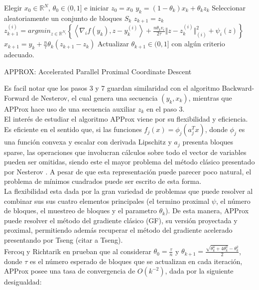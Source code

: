 \documentclass{article}
\newcommand{\R}{\mathbb{R}}
\begin{document}
\begin{algorithm}[H]
\begin{algorithmic}[1]
\STATE Elegir $x_0 \in \R^N$, $\theta_0 \in (0,1]$ e iniciar $z_0 = x_0$
	\STATE $y_k = (1-\theta_k)x_k+\theta_k z_k$
	\STATE Seleccionar aleatoriamente un conjunto de bloques $S_k$
	\STATE $z_{k+1} = z_k$
		\STATE $z^{(i)}_{k+1} = argmin_{z \in \R^{N_i}} \left\lbrace \left< \nabla_i f(y_k),z-y^{(i)}_k   \right> + \frac{n \theta_k v_i}{2\tau} \Vert z - z_k^{(i)} \Vert^2_{(i)} + \psi_i(z)    \right\rbrace$
	\ENDFOR
	\STATE $x_{k+1} = y_k + \frac{n}{\tau} \theta_k (z_{k+1}-z_k)$
	\STATE Actualizar $\theta_{k+1} \in (0,1]$  con algún criterio adecuado.
\ENDFOR
\end{algorithmic}
\caption{APPROX: Accelerated Parallel Proximal Coordinate Descent}\label{alg:APPROX_1}
\end{algorithm}

Es facil notar que los pasos 3 y 7 guardan similaridad con el algoritmo Backward-Forward de Nesterov, el cual genera una secuencia $(y_k,x_k)$, mientras que APProx hace uso de una secuencia auxiliar $z_k$ en el paso 3. \\

El interés de estudiar el algoritmo APProx viene por su flexibilidad y eficiencia. Es eficiente en el sentido que, si las funciones $f_j(x) = \phi_j(a_j^Tx)$, donde $\phi_j$ es una función convexa y escalar con derivada Lipschitz y $a_j$ presenta bloques sparse, las operaciones que involucran cálculos sobre todo el vector de variables pueden ser omitidas, siendo este el mayor problema del método clásico presentado por Nesterov \cite{Nesterov}. A pesar de que esta representación puede parecer poco natural, el problema de mínimos cuadrados puede ser escrito de esta forma. \\

La flexibilidad esta dada por la gran variedad de problemas que puede resolver al combinar sus sus cuatro elementos principales (el termino proximal $\psi$, el número de bloques, el muestreo de bloques y el parametro $\theta_k$). De esta manera, APProx puede resolver el método del gradiente clásico (GF), su versión proyectada y proximal, permitiendo además recuperar el método del gradiente acelerado presentando por Tseng (citar a Tseng).\\


Fercoq y Richtarik en \cite{Fercoq_Richtarik} prueban que al considerar  $\theta_0 = \frac{\tau}{n}$ y $\theta_{k+1} = \frac{\sqrt{\theta_k^4 + 4\theta_k^2}-\theta_k^2}{2}$, donde $\tau$ es el número esperado de bloques que se actualizan en cada iteración, APProx posee una tasa de convergencia de  $O(k^{-2})$, dada por la siguiente desigualdad:
\end{document}
